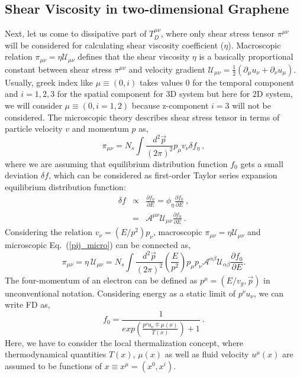 \documentclass[amsmath,amssymb,aps,prb]{revtex4-2}
\newcommand{\be}{\begin{equation}}
\newcommand{\ee}{\end{equation}}
\newcommand{\bea}{\begin{eqnarray}}
\newcommand{\eea}{\end{eqnarray}}
\newcommand{\nn}{\nonumber}
\begin{document}
    \subsection{Shear Viscosity in two-dimensional Graphene}
    Next, let us come to dissipative part of $T_D^{\mu\nu}$, where only shear stress tensor $\pi^{\mu\nu}$ will be considered for calculating shear viscosity coefficient ($\eta$). Macroscopic relation $\pi_{\mu\nu}=\eta \mathcal{U}_{\mu\nu}$ defines that the shear viscosity $\eta$ is a basically proportional constant between shear stress $\pi^{\mu\nu}$ and velocity gradient $\mathcal{U}_{\mu\nu}=\frac{1}{2} (\partial_{\mu} u_{\nu}+\partial_{\nu} u_{\mu})$.
    Usually, greek index like $\mu\equiv(0,i)$ takes values 0 for the temporal component and $i=1,2,3$ for the spatial component for 3D system but here for 2D system, we will consider $\mu\equiv(0,i=1,2)$ because z-component $i=3$ will not be considered.
%
    The microscopic theory describes shear stress tensor in terms of particle velocity $v$ and momentum $p$ as,
%
    \be
    \pi_{\mu\nu}=N_s \int \frac{d^2 \vec{p}}{(2 \pi)^2} p_{\mu} v_{\nu} \delta f_\eta~,
    \label{pij_micro}
    \ee
%
    where we are assuming that equilibrium distribution function $f_0$ gets a small deviation $\delta f$, which can be considered as first-order Taylor series expansion equilibrium distribution function:
%
    \bea 
    \delta f &\propto& \frac{\partial f_0}{\partial E}
    =\phi_\eta \frac{\partial f_0}{\partial E}~,
    \nn\\
    &=&\mathcal{A}^{\mu\nu} \mathcal{U}_{\mu\nu} \frac{\partial f_0}{\partial E}~.
    \eea
%
    Considering the relation $v_{\nu}=(E/p^2) p_{\nu}$, macroscopic $\pi_{\mu\nu}=\eta \mathcal{U}_{\mu\nu}$ and microscopic Eq.~(\ref{pij_micro}) can be connected as, 
%
    \be
    \pi_{\mu\nu}=\eta ~\mathcal{U}_{\mu\nu}= N_s \int \frac{d^2 \vec{p}}{(2 \pi)^2} \left(\frac{E}{p^2}\right)p_{\mu} p_{\nu} \mathcal{A}^{\alpha\beta} \mathcal{U}_{\alpha\beta} \frac{\partial f_0}{\partial E}.
    \ee
%
    The four-momentum of an electron can be defined as $p^\mu=(E/v_g, \vec{p})$ in unconventional notation.
%
    Considering energy as a static limit of $p^\nu u_\nu$, we can write FD as,
%
    \be
    f_0=\frac{1}{exp{\left( \frac{p^\nu u_\nu \mp \mu(x)}{T(x)}\right)+1}}~.
    \label{a1}
    \ee
    Here, we have to consider the local thermalization concept, where thermodynamical quantities $T(x)$, $\mu(x)$ as well as fluid velocity $u^{\mu}(x)$ are assumed to be functions of $x \equiv x^{\mu}=(x^0, x^i)$.
\end{document}
